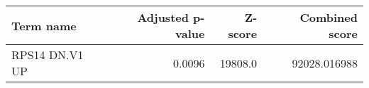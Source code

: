\begin{tabular}{lrrr}
\toprule
     Term name &  Adjusted p-value &  Z-score &  Combined score \\
\midrule
RPS14 DN.V1 UP &            0.0096 &  19808.0 &    92028.016988 \\
\bottomrule
\end{tabular}
